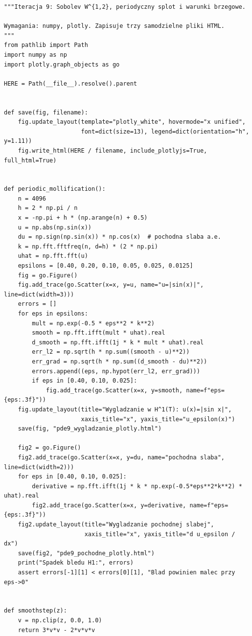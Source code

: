 \begin{lstlisting}[style=pythonpde,caption={Wygładzanie w $H^1$, pochodna słaba i obcięcia brzegowe -- Plotly},label={code:pde-sobolev9}]
"""Iteracja 9: Sobolev W^{1,2}, periodyczny splot i warunki brzegowe.

Wymagania: numpy, plotly. Zapisuje trzy samodzielne pliki HTML.
"""
from pathlib import Path
import numpy as np
import plotly.graph_objects as go

HERE = Path(__file__).resolve().parent


def save(fig, filename):
    fig.update_layout(template="plotly_white", hovermode="x unified",
                      font=dict(size=13), legend=dict(orientation="h", y=1.11))
    fig.write_html(HERE / filename, include_plotlyjs=True, full_html=True)


def periodic_mollification():
    n = 4096
    h = 2 * np.pi / n
    x = -np.pi + h * (np.arange(n) + 0.5)
    u = np.abs(np.sin(x))
    du = np.sign(np.sin(x)) * np.cos(x)  # pochodna slaba a.e.
    k = np.fft.fftfreq(n, d=h) * (2 * np.pi)
    uhat = np.fft.fft(u)
    epsilons = [0.40, 0.20, 0.10, 0.05, 0.025, 0.0125]
    fig = go.Figure()
    fig.add_trace(go.Scatter(x=x, y=u, name="u=|sin(x)|", line=dict(width=3)))
    errors = []
    for eps in epsilons:
        mult = np.exp(-0.5 * eps**2 * k**2)
        smooth = np.fft.ifft(mult * uhat).real
        d_smooth = np.fft.ifft(1j * k * mult * uhat).real
        err_l2 = np.sqrt(h * np.sum((smooth - u)**2))
        err_grad = np.sqrt(h * np.sum((d_smooth - du)**2))
        errors.append((eps, np.hypot(err_l2, err_grad)))
        if eps in [0.40, 0.10, 0.025]:
            fig.add_trace(go.Scatter(x=x, y=smooth, name=f"eps={eps:.3f}"))
    fig.update_layout(title="Wygladzanie w H^1(T): u(x)=|sin x|",
                      xaxis_title="x", yaxis_title="u_epsilon(x)")
    save(fig, "pde9_wygladzanie_plotly.html")

    fig2 = go.Figure()
    fig2.add_trace(go.Scatter(x=x, y=du, name="pochodna slaba", line=dict(width=2)))
    for eps in [0.40, 0.10, 0.025]:
        derivative = np.fft.ifft(1j * k * np.exp(-0.5*eps**2*k**2) * uhat).real
        fig2.add_trace(go.Scatter(x=x, y=derivative, name=f"eps={eps:.3f}"))
    fig2.update_layout(title="Wygladzanie pochodnej slabej",
                       xaxis_title="x", yaxis_title="d u_epsilon / dx")
    save(fig2, "pde9_pochodne_plotly.html")
    print("Spadek bledu H1:", errors)
    assert errors[-1][1] < errors[0][1], "Blad powinien malec przy eps->0"


def smoothstep(z):
    v = np.clip(z, 0.0, 1.0)
    return 3*v*v - 2*v*v*v



\end{lstlisting}
